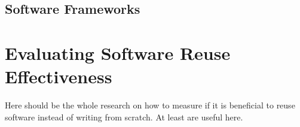 
\subsection{Software Frameworks}





\section{Evaluating Software Reuse Effectiveness}

Here should be the whole research on how to measure if it is beneficial to reuse software instead of writing from scratch. At least \citet{mohagheghi_empirical_2008,frakes_software_1996,selby_enabling_2005} are useful here.
